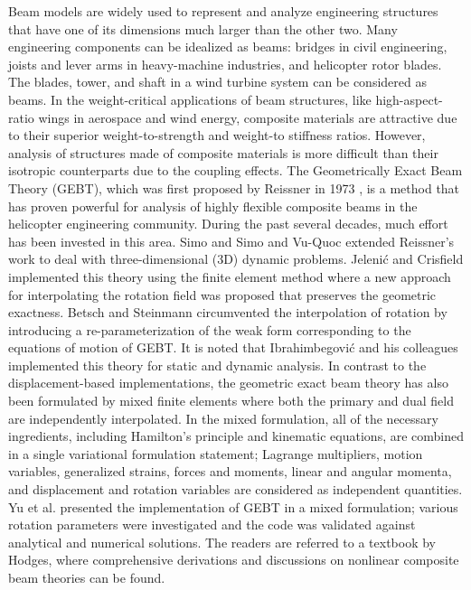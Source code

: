 \documentclass{aiaa-tc}
\begin{document}
Beam models are widely used to represent and analyze engineering structures
that have one of its dimensions much larger than the other two. Many
engineering components can be idealized as beams: bridges in civil
engineering, joists and lever arms in heavy-machine industries, and
helicopter rotor blades. The blades, tower, and shaft in a wind turbine
system can be considered as beams. In the weight-critical applications of
beam structures, like high-aspect-ratio wings in aerospace and wind energy,
composite materials are attractive due to their superior weight-to-strength
and weight-to stiffness ratios.  However, analysis of structures made of
composite materials is more difficult than their isotropic counterparts due
to the coupling effects. The Geometrically Exact Beam Theory (GEBT), which
was first proposed by Reissner in 1973 \cite{Ressiner1973}, is a method that
has proven powerful for analysis of highly flexible composite beams in the
helicopter engineering community. During the past several decades, much
effort has been invested in this area. Simo\cite{Simo1985} and Simo and
Vu-Quoc\cite{Simo1986} extended Reissner's work to deal with
three-dimensional (3D) dynamic problems. Jeleni\'c and
Crisfield\cite{Crisfield1999} implemented this theory using the finite
element method where a new approach for interpolating the rotation field was
proposed that preserves the geometric exactness. Betsch and
Steinmann\cite{Betsch2002} circumvented the interpolation of rotation by
introducing a re-parameterization of the weak form corresponding to the
equations of motion of GEBT. It is noted that Ibrahimbegovi\'c and his
colleagues implemented this theory for static\cite{Ibrahim1995} and
dynamic\cite{Ibrahim1998} analysis. In contrast to the displacement-based
implementations, the geometric exact beam theory has also been formulated by
mixed finite elements where both the primary and dual field are
independently interpolated\cite{CookFEM}. In the mixed formulation, all of
the necessary ingredients, including Hamilton's principle and kinematic
equations, are combined in a single variational formulation statement;
Lagrange multipliers, motion variables, generalized strains, forces
and moments, linear and angular momenta, and displacement and rotation
variables are considered as independent quantities. Yu et al.\cite{YuGEBT,
Wang:GEBT2013} presented the implementation of GEBT in a mixed formulation;
various rotation parameters were investigated and the code was validated
against analytical and numerical solutions. The readers are referred to a
textbook by Hodges\cite{HodgesBeamBook}, where comprehensive derivations
and discussions on nonlinear composite beam theories can be found.
\end{document}
